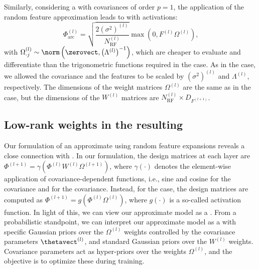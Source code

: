 Similarly, considering a \dgp with \arccosine covariances of order $p=1$, the application of the random feature approximation leads to  with \relu activations:
\begin{equation}
	\Phi^{(l)}_{\text{arc}} = \sqrt{\frac{ 2 (\sigma^2)^{(l)}}{N_{\mathrm{RF}}^{(l)}}}  \max\left(0, F^{(l)} \Omega^{(l)}\right)  \text{,}
\end{equation}
with
$
\Omega^{(l)}_{\cdot j} \sim \norm\left(\zerovect, \left(\Lambda^{(l)}\right)^{-1} \right) %
$,
which are cheaper to evaluate and differentiate than the trigonometric functions required in the \rbf case.
As in the \rbf case, we allowed the covariance and the features to be scaled by $(\sigma^2)^{(l)}$ and $\Lambda^{(l)}$, respectively.
The dimensions of the weight matrices $\Omega^{(l)}$ are the same as in the \rbf case, but the dimensions of the $W^{(l)}$ matrices are $N_{\mathrm{RF}}^{(l)} \times D_{F^{(l+1)}}$.

\subsection{Low-rank weights in the resulting \dnn}

Our formulation of an approximate \dgp using random feature expansions reveals a close connection with .
In our formulation, the design matrices at each layer are
$
\Phi^{(l+1)} = \gamma\left(\Phi^{(l)} W^{(l)} \Omega^{(l+1)} \right)
$,
where $\gamma(\cdot)$ denotes the element-wise application of covariance-dependent functions, i.e., sine and cosine for the \rbf covariance and \relu for the \arccosine covariance. 
Instead, for the \dnn case, the design matrices are computed as
$
\Phi^{(l+1)} = g(\Phi^{(l)} \Omega^{(l)}) %
$,
where $g(\cdot)$ is a so-called activation function.
In light of this, we can view our approximate \dgp model as a \dnn. %
From a probabilistic standpoint, we can interpret our approximate \dgp model as a \dnn with specific Gaussian priors over the $\Omega^{(l)}$ weights controlled by the covariance parameters $\thetavect^{(l)}$, and standard Gaussian priors over the $W^{(l)}$ weights. %
Covariance parameters act as hyper-priors over the weights $\Omega^{(l)}$, and the objective is to optimize these during training.


